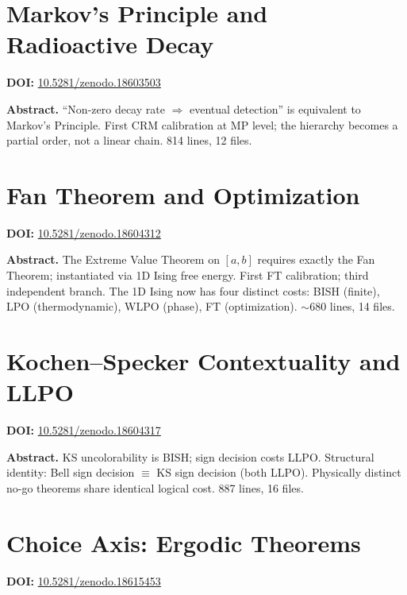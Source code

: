 \documentclass[11pt,a4paper]{article}
\begin{document}
\section{Markov's Principle and Radioactive Decay}
\label{sec:p22}
\textbf{DOI:} \href{https://doi.org/10.5281/zenodo.18603503}{10.5281/zenodo.18603503}

\bigskip
\noindent\textbf{Abstract.}
``Non-zero decay rate $\Rightarrow$ eventual detection'' is equivalent to Markov's Principle. First CRM calibration at MP level; the hierarchy becomes a partial order, not a linear chain. 814 lines, 12 files.

\section{Fan Theorem and Optimization}
\label{sec:p23}
\textbf{DOI:} \href{https://doi.org/10.5281/zenodo.18604312}{10.5281/zenodo.18604312}

\bigskip
\noindent\textbf{Abstract.}
The Extreme Value Theorem on $[a,b]$ requires exactly the Fan Theorem; instantiated via 1D Ising free energy. First FT calibration; third independent branch. The 1D Ising now has four distinct costs: BISH (finite), LPO (thermodynamic), WLPO (phase), FT (optimization). $\sim$680 lines, 14 files.

\section{Kochen--Specker Contextuality and LLPO}
\label{sec:p24}
\textbf{DOI:} \href{https://doi.org/10.5281/zenodo.18604317}{10.5281/zenodo.18604317}

\bigskip
\noindent\textbf{Abstract.}
KS uncolorability is BISH; sign decision costs LLPO. Structural identity: Bell sign decision $\equiv$ KS sign decision (both LLPO). Physically distinct no-go theorems share identical logical cost. 887 lines, 16 files.

\section{Choice Axis: Ergodic Theorems}
\label{sec:p25}
\textbf{DOI:} \href{https://doi.org/10.5281/zenodo.18615453}{10.5281/zenodo.18615453}
\end{document}
